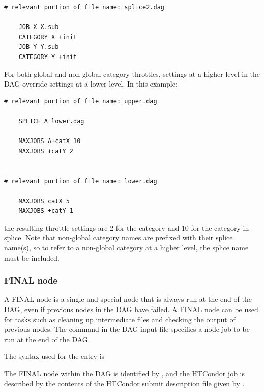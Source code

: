 \begin{verbatim}
# relevant portion of file name: splice2.dag

    JOB X X.sub
    CATEGORY X +init
    JOB Y Y.sub
    CATEGORY Y +init

\end{verbatim}

For both global and non-global category throttles, settings at a higher
level in the DAG override settings at a lower level.
In this example:

\begin{verbatim}
# relevant portion of file name: upper.dag

    SPLICE A lower.dag

    MAXJOBS A+catX 10
    MAXJOBS +catY 2


# relevant portion of file name: lower.dag

    MAXJOBS catX 5
    MAXJOBS +catY 1

\end{verbatim}

the resulting throttle settings are 2 for the  category
and 10 for the  category in splice.
Note that non-global category names are
prefixed with their splice name(s), so to refer to a non-global category 
at a higher level, the splice name must be included.

\subsubsection{\label{sec:DAGFinalNode}FINAL node}

A FINAL node is a single and special node that is always run at 
the end of the DAG,
even if previous nodes in the DAG have failed.  
A FINAL node can be used
for tasks such as cleaning up intermediate files and checking the output
of previous nodes.
The  command in the DAG input file specifies 
a node job to be run at the end of the DAG.  

The syntax used for the  entry is

  
 

The FINAL node within the DAG is identified by , 
and the HTCondor job
is described by the contents of the HTCondor submit description file
given by .

